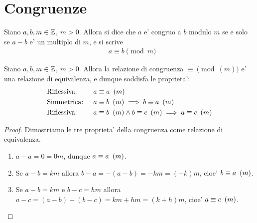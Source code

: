 \section{Congruenze}

\begin{definition} \label{def_congr}
    Siano $a, b, m \in \mathbb{Z}$, $m > 0$. Allora si dice che $a$ e' congruo a $b$ modulo $m$ se e solo se $a - b$ e' un multiplo di $m$, e si scrive
    \begin{align*}
        &a \equiv b \pmod m
    \end{align*}
\end{definition}

\begin{theorem}
    Siano $a, b, m \in \mathbb{Z}$, $m > 0$. Allora la relazione di congruenza $\equiv \pmod(m)$ e' una relazione di equivalenza, e dunque soddisfa le proprieta':
    \begin{align}
        &\text{Riflessiva: } &&a \equiv a \ \left(m\right) \label{congr_rifl}\\
        &\text{Simmetrica: } &&a \equiv b \ \left(m\right) \implies b \equiv a \ \left(m\right) \label{congr_simm}\\
        &\text{Riflessiva: } &&a \equiv b \ \left(m\right) \land b \equiv c \ \left(m\right) \implies a \equiv c \ \left(m\right)  \label{congr_trans}
    \end{align}
\end{theorem}
\begin{proof} Dimostriamo le tre proprieta' della congruenza come relazione di equivalenza.
    \begin{enumerate}
        \item $a - a = 0 = 0m$, dunque $a \equiv a \ \left(m\right)$.
        \item Se $a - b = km$ allora $b - a = -(a - b) = -km = (-k)m$, cioe' $b \equiv a \ \left(m\right)$.
        \item Se $a - b = km$ e $b - c = hm$ allora $a - c = (a - b) + (b - c) = km + hm = (k + h)m$, 
            cioe' $a \equiv c \ \left(m\right)$.
    \end{enumerate}
\end{proof}

